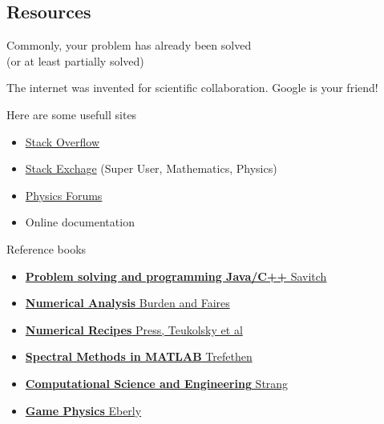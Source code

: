 \documentclass[xcolor={dvipsnames}]{beamer}
\begin{document}
\subsection{Resources}
\begin{frame}{Commonly, your problem has already been solved\\ (or at least partially solved)}{}

The internet was invented for scientific collaboration. Google is your friend!
 
\bigskip
Here are some usefull sites
\begin{itemize}
\item \href{https://stackoverflow.com/}{Stack Overflow}
\item \href{http://stackexchange.com/}{Stack Exchage} (Super User, Mathematics, Physics)
\item \href{https://www.physicsforums.com/}{Physics Forums}
\item Online documentation
\end{itemize}
\end{frame}


\begin{frame}{Reference books}{}

\begin{itemize}
	\item \href{https://www.amazon.com/Java-Introduction-Problem-Solving-Programming/dp/0133766268/ref=sr_1_1?s=books&ie=UTF8&qid=1475804714&sr=1-1&keywords=Problem+solving+and+programming+Java}{\textbf{Problem solving and programming Java/C++} Savitch}
	\item \href{https://www.amazon.com/Numerical-Analysis-Richard-L-Burden/dp/1305253663/ref=sr_1_1?s=books&ie=UTF8&qid=1475804742&sr=1-1&keywords=numerical+analysis}{\textbf{Numerical Analysis} Burden and Faires}
	\item \href{https://www.amazon.com/Numerical-Recipes-3rd-Scientific-Computing/dp/0521880688/ref=sr_1_1?s=books&ie=UTF8&qid=1475804768&sr=1-1&keywords=Numerical+Recipes}{\textbf{Numerical Recipes} Press, Teukolsky et al}
	\item \href{https://www.amazon.com/Spectral-Methods-MATLAB-Software-Environments/dp/0898714656/ref=sr_1_1?s=books&ie=UTF8&qid=1475804790&sr=1-1&keywords=Spectral+Methods+in+MATLAB}{\textbf{Spectral Methods in MATLAB} Trefethen}
	\item \href{https://www.amazon.com/Computational-Science-Engineering-Gilbert-Strang/dp/0961408812/ref=sr_1_1?s=books&ie=UTF8&qid=1475804813&sr=1-1&keywords=Computational+Science+and+Engineering}{\textbf{Computational Science and Engineering} Strang}
	\item \href{https://www.amazon.com/Game-Physics-David-H-Eberly/dp/B003VIWRWW/ref=sr_1_2?s=books&ie=UTF8&qid=1475804827&sr=1-2&keywords=game+physics}{\textbf{Game Physics} Eberly}
\end{itemize}
	
\end{frame}
\end{document}

